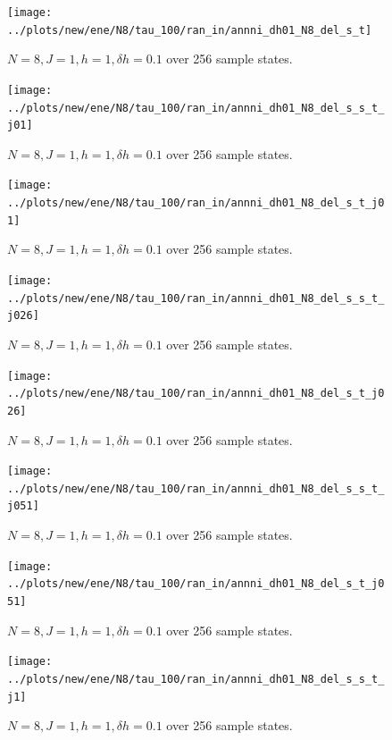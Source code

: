 \documentclass[a4paper]{article}
\begin{document}
\begin{figure}[h!]
  \centering
  \texttt{[image: ../plots/new/ene/N8/tau\_100/ran\_in/annni\_dh01\_N8\_del\_s\_t]}
  \caption{$N = 8, J = 1, h = 1, \delta h=0.1$ over 256 sample states.}
  \label{fig:}
\end{figure}

\begin{figure}[h!]
  \centering
  \texttt{[image: ../plots/new/ene/N8/tau\_100/ran\_in/annni\_dh01\_N8\_del\_s\_s\_t\_j01]}
  \caption{$N = 8, J = 1, h = 1, \delta h=0.1$ over 256 sample states.}
  \label{fig:}
\end{figure}

\begin{figure}[h!]
  \centering
  \texttt{[image: ../plots/new/ene/N8/tau\_100/ran\_in/annni\_dh01\_N8\_del\_s\_t\_j01]}
  \caption{$N = 8, J = 1, h = 1, \delta h=0.1$ over 256 sample states.}
  \label{fig:}
\end{figure}

\begin{figure}[h!]
  \centering
  \texttt{[image: ../plots/new/ene/N8/tau\_100/ran\_in/annni\_dh01\_N8\_del\_s\_s\_t\_j026]}
  \caption{$N = 8, J = 1, h = 1, \delta h=0.1$ over 256 sample states.}
  \label{fig:}
\end{figure}

\begin{figure}[h!]
  \centering
  \texttt{[image: ../plots/new/ene/N8/tau\_100/ran\_in/annni\_dh01\_N8\_del\_s\_t\_j026]}
  \caption{$N = 8, J = 1, h = 1, \delta h=0.1$ over 256 sample states.}
  \label{fig:}
\end{figure}

\begin{figure}[h!]
  \centering
  \texttt{[image: ../plots/new/ene/N8/tau\_100/ran\_in/annni\_dh01\_N8\_del\_s\_s\_t\_j051]}
  \caption{$N = 8, J = 1, h = 1, \delta h=0.1$ over 256 sample states.}
  \label{fig:}
\end{figure}

\begin{figure}[h!]
  \centering
  \texttt{[image: ../plots/new/ene/N8/tau\_100/ran\_in/annni\_dh01\_N8\_del\_s\_t\_j051]}
  \caption{$N = 8, J = 1, h = 1, \delta h=0.1$ over 256 sample states.}
  \label{fig:}
\end{figure}


\begin{figure}[h!]
  \centering
  \texttt{[image: ../plots/new/ene/N8/tau\_100/ran\_in/annni\_dh01\_N8\_del\_s\_s\_t\_j1]}
  \caption{$N = 8, J = 1, h = 1, \delta h=0.1$ over 256 sample states.}
  \label{fig:}
\end{figure}
\end{document}
